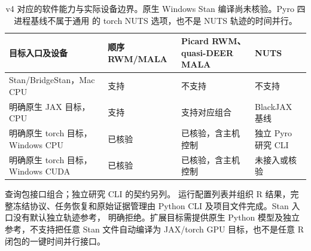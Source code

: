 \begin{table}[htbp]\centering\smalltable
\begin{tabularx}{\linewidth}{P{36mm}Y Y Y}\toprule
目标入口及设备 & 顺序 RWM/MALA & Picard RWM、quasi-DEER MALA & NUTS\\\midrule
Stan/BridgeStan，Mac CPU & 支持 & 不支持 & 不支持\\
明确原生 JAX 目标，CPU & 支持 & 支持对应组合 & BlackJAX 基线\\
明确原生 torch 目标，Windows CPU & 已核验 & 已核验，含主机控制 & 独立 Pyro 研究 CLI\\
明确原生 torch 目标，Windows CUDA & 已核验 & 已核验，含主机控制 & 未接入或核验\\\bottomrule
\end{tabularx}
\caption{v4 对应的软件能力与实际设备边界。原生 Windows Stan 编译尚未核验。Pyro 四进程基线不属于通用  的 torch NUTS 选项，也不是 NUTS 轨迹的时间并行。}
\end{table}

 查询包接口组合；独立研究 CLI 的契约另列。 运行配置列表并组织 R 结果，完整冻结协议、任务恢复和原始证据管理由 Python CLI 及项目文件完成。Stan 入口没有默认独立轨迹参考， 明确拒绝。扩展目标需提供原生 Python 模型及独立参考，不支持把任意 Stan 文件自动编译为 JAX/torch GPU 目标，也不是任意 R 闭包的一键时间并行接口。
